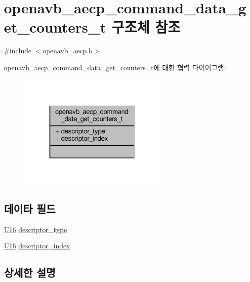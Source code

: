 \hypertarget{structopenavb__aecp__command__data__get__counters__t}{}\section{openavb\+\_\+aecp\+\_\+command\+\_\+data\+\_\+get\+\_\+counters\+\_\+t 구조체 참조}
\label{structopenavb__aecp__command__data__get__counters__t}


{\ttfamily \#include $<$openavb\+\_\+aecp.\+h$>$}



openavb\+\_\+aecp\+\_\+command\+\_\+data\+\_\+get\+\_\+counters\+\_\+t에 대한 협력 다이어그램\+:
\nopagebreak
\begin{figure}[H]
\begin{center}
\leavevmode
\includegraphics[width=208pt]{structopenavb__aecp__command__data__get__counters__t__coll__graph}
\end{center}
\end{figure}
\subsection*{데이타 필드}
\begin{DoxyCompactItemize}
\item 
\hyperlink{openavb__types__base__pub_8h_a0a0a322d5fa4a546d293a77ba8b4a71f}{U16} \hyperlink{structopenavb__aecp__command__data__get__counters__t_a1e231d7874aada5925b29affc76782cc}{descriptor\+\_\+type}
\item 
\hyperlink{openavb__types__base__pub_8h_a0a0a322d5fa4a546d293a77ba8b4a71f}{U16} \hyperlink{structopenavb__aecp__command__data__get__counters__t_ab26fb363c24b9a2a4391f9171c981b08}{descriptor\+\_\+index}
\end{DoxyCompactItemize}


\subsection{상세한 설명}


